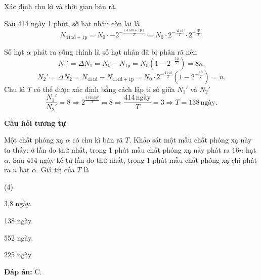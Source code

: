 \begin{dang}{Xác định chu kì và thời gian bán rã.}
{	Sau 414 ngày 1 phút, số hạt nhân còn lại là
	\begin{equation*}
	N_{414\text{d}+1\text{p}}= N_0\cdot -2^{-\frac{(414\text{d}+1\text{p})}{T}}=N_0\cdot 2^{-\frac{414\text{d}}{T}}\cdot 2^{-\frac{1\text{p}}{T}}.
	\end{equation*}

	Số hạt $\alpha$ phát ra cũng chính là số hạt nhân đã bị phân rã nên
	\begin{equation*}
	N_1'=\Delta N_1=N_0-N_{1\text{p}}=N_0\left(1- 2^{-\frac{1\text{p}}{T}}\right) = 8n.
	\end{equation*}
	\begin{equation*}
	N_2'=\Delta N_2=N_{414\text{d}}-N_{414\text{d}+1\text{p}}=N_0\cdot 2^{-\frac{414\text{d}}{T}}\left(1- 2^{-\frac{1\text{p}}{T}}\right)=n.
	\end{equation*}
	Chu kì $T$ có thể được xác định bằng cách lập tỉ số giữa $N_1'$ và $N_2'$
	\begin{equation*}
	\dfrac{N_1'}{N_2'}=8\Rightarrow 2^{\frac{414\,\text{ngày}}{T}}=8\Rightarrow \dfrac{414\,\text{ngày}}{T}=3\Rightarrow T= 138\,\text{ngày}.
	\end{equation*}

	\begin{center}
		\textbf{Câu hỏi tương tự}
	\end{center}	
	
	Một chất phóng xạ $\alpha$ có chu kì bán rã $T$. Khảo sát một mẫu chất phóng xạ này ta thấy: ở lần đo thứ nhất, trong 1 phút mẫu chất phóng xạ này phát ra $16n$ hạt $\alpha$. Sau 414 ngày kể từ lần đo thứ nhất, trong 1 phút mẫu chất phóng xạ chỉ phát ra $n$ hạt $\alpha$. Giá trị của $T$ là
	\begin{mcq}(4)
		\item 3,8 ngày.
		\item 138 ngày.
		\item 552 ngày.
		\item 225 ngày.
	\end{mcq}
	
	\textbf{Đáp án:} C.
}

\end{dang}